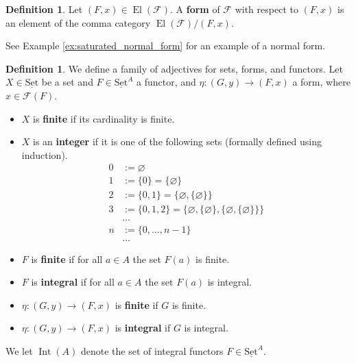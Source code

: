 \documentclass[12pt]{article}
\theoremstyle{plain}
\theoremstyle{definition}
\newtheorem{defn}[thm]{Definition} %
\newcommand{\scr}[1]{\mathscr{#1}}
\newcommand{\lto}{\longrightarrow}
\newcommand{\set}{\operatorname{\underline{Set}}}
\begin{document}
	\begin{defn}\label{def:forms}
		Let $(F,x) \in \operatorname{El}(\scr{F})$. A \textbf{form} of $\scr{F}$ with respect to $(F,x)$ is an element of the comma category $\operatorname{El}(\scr{F})/(F,x)$.
		
		\end{defn}

See Example \ref{ex:saturated_normal_form} for an example of a normal form.
	
	\begin{defn}\label{def:integer}
		We define a family of adjectives for sets, forms, and functors. Let $X \in \set$ be a set and $F \in \set^A$ a functor, and $\eta: (G,y) \lto (F,x)$ a form, where $x \in \scr{F}(F)$.
		\begin{itemize}
			\item $X$ is \textbf{finite} if its cardinality is finite.
			\item $X$ is an \textbf{integer} if it is one of the following sets (formally defined using induction).
			\begin{align*}
				0 &:= \varnothing\\
				1 &:= \lbrace 0 \rbrace = \lbrace \varnothing \rbrace\\
				2 &:= \lbrace 0, 1 \rbrace = \big\lbrace \varnothing, \lbrace \varnothing \rbrace \big\rbrace\\
				3 &:= \lbrace 0, 1, 2 \rbrace = \big\lbrace \varnothing, \lbrace \varnothing \rbrace, \lbrace  \varnothing , \lbrace \varnothing \rbrace \rbrace \big\rbrace\\
				&\hdots\\
				n &:= \lbrace 0, \hdots, n-1 \rbrace\\
				&\hdots
			\end{align*}
		\item $F$ is \textbf{finite} if for all $a \in A$ the set $F(a)$ is finite.
		\item $F$ is \textbf{integral} if for all $a \in A$ the set $F(a)$ is integral.
		\item $\eta: (G,y) \lto (F,x)$ is \textbf{finite} if $G$ is finite.
		\item $\eta: (G,y) \lto (F,x)$ is \textbf{integral} if $G$ is integral.
			\end{itemize}
		We let $\operatorname{Int}(A)$ denote the set of integral functors $F \in \set^A$.
		\end{defn}
	
\end{document}
